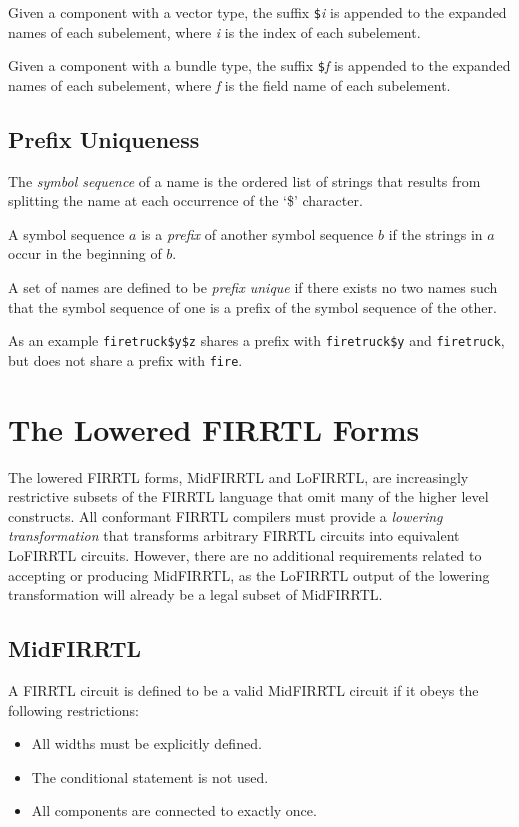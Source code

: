 \documentclass[12pt]{article}
\begin{document}
Given a component with a vector type, the suffix \verb|$|{\em i} is appended to the expanded names of each subelement, where {\em i} is the index of each subelement.

Given a component with a bundle type, the suffix \verb|$|{\em f} is appended to the expanded names of each subelement, where {\em f} is the field name of each subelement.

\subsection{Prefix Uniqueness} \label{prefix_unique}

The {\em symbol sequence} of a name is the ordered list of strings that results from splitting the name at each occurrence of the `\$' character.

A symbol sequence $a$ is a {\em prefix} of another symbol sequence $b$ if the strings in $a$ occur in the beginning of $b$.

A set of names are defined to be {\em prefix unique} if there exists no two names such that the symbol sequence of one is a prefix of the symbol sequence of the other.

As an example \verb|firetruck$y$z| shares a prefix with \verb|firetruck$y| and \verb|firetruck|, but does not share a prefix with \verb|fire|.

\section{The Lowered FIRRTL Forms}

The lowered FIRRTL forms, MidFIRRTL and LoFIRRTL, are increasingly restrictive subsets of the FIRRTL language that omit many of the higher level constructs. All conformant FIRRTL compilers must provide a {\em lowering transformation} that transforms arbitrary FIRRTL circuits into equivalent LoFIRRTL circuits. However, there are no additional requirements related to accepting or producing MidFIRRTL, as the LoFIRRTL output of the lowering transformation will already be a legal subset of MidFIRRTL.

\subsection{MidFIRRTL}

A FIRRTL circuit is defined to be a valid MidFIRRTL circuit if it obeys the following restrictions:
\begin{itemize}
\item All widths must be explicitly defined.
\item The conditional statement is not used.
\item All components are connected to exactly once.
\end{itemize}
\end{document}
